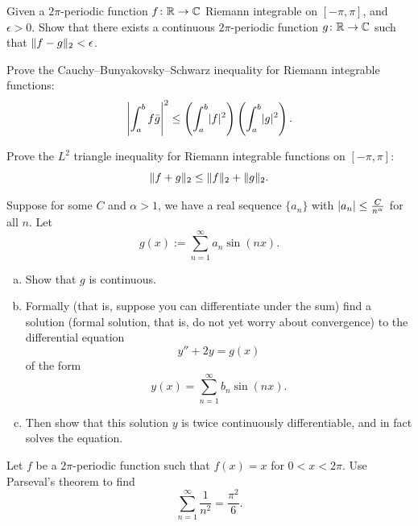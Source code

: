 \begin{exercise}
Given a $2\pi$-periodic function $f \colon {\mathbb{R}} \to {\mathbb{C}}$ Riemann integrable on
$[-\pi,\pi]$,
and $\epsilon > 0$.
Show that there exists a continuous $2\pi$-periodic function $g \colon {\mathbb{R}}
\to {\mathbb{C}}$ such that $\lVert {f-g} \rVert_2 < \epsilon$.
\end{exercise}

\begin{exercise}
Prove the Cauchy--Bunyakovsky--Schwarz inequality
for Riemann integrable functions:
\begin{equation*}
{\left\lvert {\int_a^b f\bar{g}} \right\rvert}^2
\leq
\left( \int_a^b \lvert {f} \rvert^2 \right)
\left( \int_a^b \lvert {g} \rvert^2 \right) .
\end{equation*}
\end{exercise}

\begin{exercise}
Prove the $L^2$ triangle inequality 
for Riemann integrable functions on $[-\pi,\pi]$:
\begin{equation*}
\lVert {f+g} \rVert_2 \leq \lVert {f} \rVert_2 + \lVert {g} \rVert_2 .
\end{equation*}
\end{exercise}

\pagebreak[2]
\begin{exercise}
Suppose for some $C$ and $\alpha > 1$, we have
a real sequence $\{ a_n \}$ with
$\left\lvert {a_n} \right\rvert \leq \frac{C}{n^\alpha}$ for all $n$.
Let
\begin{equation*}
g(x) := \sum_{n=1}^\infty a_n \sin(n x) .
\end{equation*}
\begin{enumerate}[a)]
\item
Show that $g$ is continuous.
\item
Formally (that is, suppose you can differentiate under the sum)
find a solution (formal solution, that is, do not yet worry about convergence)
to the differential equation
\begin{equation*}
y''+ 2 y = g(x)
\end{equation*}
of the form
\begin{equation*}
y(x) = \sum_{n=1}^\infty b_n \sin(n x) .
\end{equation*}
\item
Then show that this solution $y$ is twice continuously differentiable,
and in fact solves the equation.
\end{enumerate}
\end{exercise}

\begin{exercise}
Let $f$ be a $2\pi$-periodic  function such
that $f(x) = x$ for $0 < x < 2\pi$.
Use Parseval's theorem to find
\begin{equation*}
\sum_{n=1}^\infty \frac{1}{n^2} = \frac{\pi^2}{6} .
\end{equation*}
\end{exercise}

